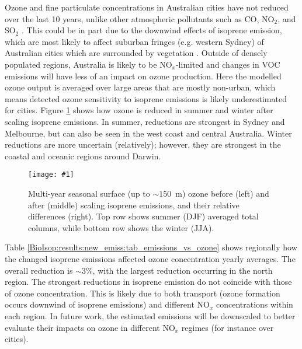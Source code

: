 \documentclass[acp, manuscript]{copernicus}
\newcommand{\parencite}{\citep}
\newcommand{\mypic}[3]{%
  \begin{figure}
    \texttt{[image: \#1]}
    \caption{#2}
    #3
  \end{figure}
}
\begin{document}
      Ozone and fine particulate concentrations in Australian cities have not reduced over the last 10 years, unlike other atmospheric pollutants such as CO, NO$_2$, and SO$_2$ \parencite{SOE2016}.
      This could be in part due to the downwind effects of isoprene emission, which are most likely to affect suburban fringes (e.g. western Sydney) of Australian cities which are surrounded by vegetation \parencite{Millet2016}.
      Outside of densely populated regions, Australia is likely to be NO$_x$-limited and changes in VOC emissions will have less of an impact on ozone production.
      Here the modelled ozone output is averaged over large areas that are mostly non-urban, which means detected ozone sensitivity to isoprene emissions is likely underestimated for cities.
      Figure \ref{BioIsop:results:emissions:fig_ozone_reduction} shows how ozone is reduced in summer and winter after scaling isoprene emissions.
      In summer, reductions are strongest in Sydney and Melbourne, but can also be seen in the west coast and central Australia.
      Winter reductions are more uncertain (relatively); however, they are strongest in the coastal and oceanic regions around Darwin.
      
      
      
      \mypic{Figures/new_emiss/O3_surf_map_seasonal.png}{%
        Multi-year seasonal surface (up to $\sim{150}$~m) ozone before (left) and after (middle) scaling isoprene emissions, and their relative differences (right).
        Top row shows summer (DJF) averaged total columns, while bottom row shows the winter (JJA).
      }{\label{BioIsop:results:emissions:fig_ozone_reduction}}
      
      Table \ref{BioIsop:results:new_emiss:tab_emissions_vs_ozone} shows regionally how the changed isoprene emissions affected ozone concentration yearly averages. 
      The overall reduction is $\sim{3\%}$, with the largest reduction occurring in the north region.
      The strongest reductions in isoprene emission do not coincide with those of ozone concentration.
      This is likely due to both transport (ozone formation occurs downwind of isoprene emissions) and different NO$_x$ concentrations within each region.
      In future work, the estimated emissions will be downscaled to better evaluate their impacts on ozone in different NO$_x$ regimes (for instance over cities).
      
\end{document}

